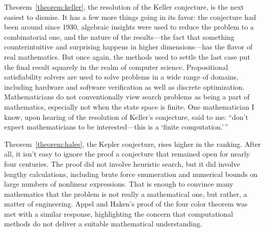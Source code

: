 \documentclass[12pt]{amsart}
\theoremstyle{definition}
\theoremstyle{remark}
\numberwithin{equation}{section}
\begin{document}
Theorem~\ref{theorem:keller}, the resolution of the Keller conjecture, is the next easiest to dismiss. It has a few more things going in its favor: the conjecture had been around since 1930, algebraic insights were used to reduce the problem to a combinatorial one, and the nature of the results---the fact that something counterintuitive and surprising happens in higher dimensions---has the flavor of real mathematics. But once again, the methods used to settle the last case put the final result squarely in the realm of computer science. Propositional satisfiability solvers are used to solve problems in a wide range of domains, including hardware and software verification as well as discrete optimization. Mathematicians do not conventionally view search problems as being a part of mathematics, especially not when the state space is finite. One mathematician I know, upon hearing of the resolution of Keller's conjecture, said to me: ``don't expect mathematicians to be interested---this is a `finite computation.'\,''

Theorem~\ref{theorem:hales}, the Kepler conjecture, rises higher in the ranking. After all, it isn't easy to ignore the proof a conjecture that remained open for nearly four centuries. The proof did not involve heuristic search, but it did involve lengthy calculations, including brute force enumeration and numerical bounds on large numbers of nonlinear expressions. That is enough to convince many mathematics that the problem is not really a mathematical one, but rather, a matter of engineering. Appel and Haken's proof of the four color theorem was met with a similar response, highlighting the concern that computational methods do not deliver a suitable mathematical understanding.
\end{document}
